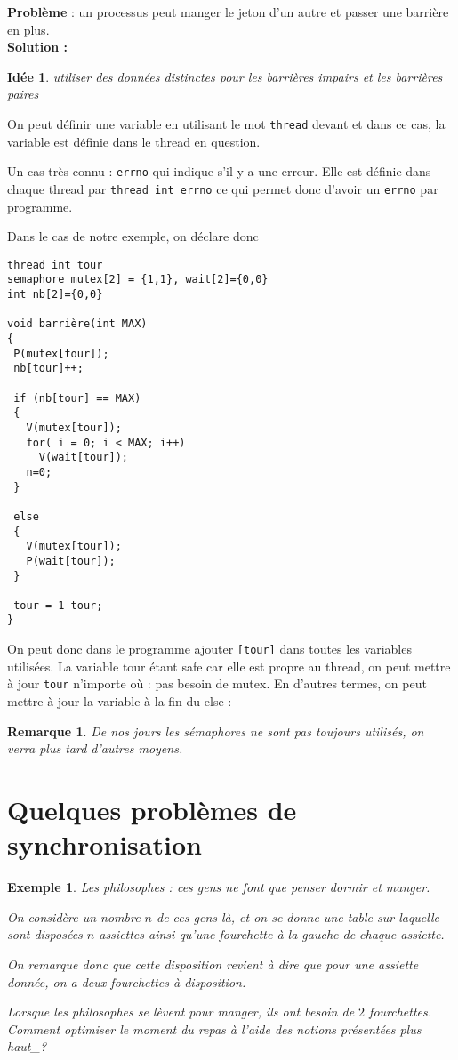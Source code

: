 \documentclass[12pt,a4paper]{report}
\newtheorem*{rem}{Remarque}
\newtheorem*{ex}{Exemple}
\newtheorem*{id}{Idée}
\begin{document}
\textbf{Problème} : un processus peut manger le jeton d'un autre et passer une barrière en plus.\\

\textbf{Solution : \\}
\begin{id} utiliser des données distinctes pour les barrières impairs et les barrières paires \end{id}

On peut définir une variable en utilisant le mot \verb?thread? devant et dans ce cas, la variable est définie dans le thread en question.

Un cas très connu : \texttt{errno} qui indique s'il y a une erreur. Elle est définie dans chaque thread par \verb?thread int errno? ce qui permet donc d'avoir un \texttt{errno} par programme.

\bigskip

Dans le cas de notre exemple, on déclare donc


\begin{verbatim}
thread int tour
semaphore mutex[2] = {1,1}, wait[2]={0,0}
int nb[2]={0,0}

void barrière(int MAX)
{
 P(mutex[tour]);
 nb[tour]++;

 if (nb[tour] == MAX)
 {
   V(mutex[tour]);
   for( i = 0; i < MAX; i++)
     V(wait[tour]);
   n=0;
 }

 else
 {
   V(mutex[tour]);
   P(wait[tour]);
 }

 tour = 1-tour;
}
\end{verbatim}

On peut donc dans le programme ajouter \verb?[tour]? dans toutes les variables utilisées.
La variable tour étant \og safe\fg{} car elle est propre  au thread, on peut mettre à jour \verb?tour? n'importe où : pas besoin de mutex. En d'autres termes, on peut mettre à jour la variable à la fin du else :



\begin{rem}
De nos jours les sémaphores ne sont pas toujours utilisés, on verra plus tard d'autres moyens.
\end{rem}

\section{Quelques problèmes de synchronisation}
\begin{ex}
  Les philosophes : ces gens ne font que penser dormir et manger.

On considère un nombre $n$ de ces gens là, et on se donne une table sur laquelle sont disposées
$n$ assiettes ainsi qu'une fourchette à la gauche de chaque assiette.

On remarque donc que cette disposition revient à dire que pour une assiette donnée, on a deux fourchettes à disposition.

Lorsque les philosophes se lèvent pour manger, ils ont besoin de $2$ fourchettes. Comment optimiser le moment du repas à l'aide des notions présentées plus haut_?
\end{ex}
\end{document}
